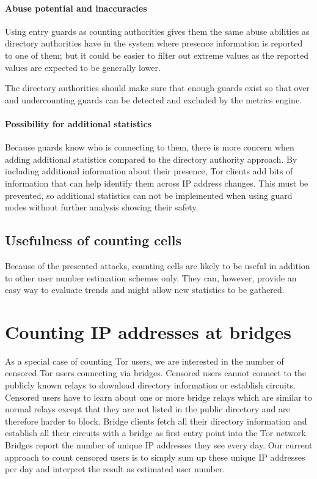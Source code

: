 \documentclass{article}
\begin{document}
\paragraph{Abuse potential and inaccuracies}
Using entry guards as counting authorities gives them the same
abuse abilities as directory authorities have in the system where
presence information is reported to one of them; but it could be easier
to filter out extreme values as the reported values are expected to
be generally lower.

The directory authorities should make sure that enough guards exist
so that over and undercounting guards can be detected and excluded
by the metrics engine.

\paragraph{Possibility for additional statistics}
Because guards know who is connecting to them, there is more concern
when adding additional statistics compared to the directory authority
approach.
By including additional information about their presence, Tor clients add
bits of information that can help identify them across IP address changes.
This must be prevented, so additional statistics can not be implemented
when using guard nodes without further analysis showing their safety.

\subsection{Usefulness of counting cells}
Because of the presented attacks, counting cells are likely to be useful
in addition to other user number estimation schemes only.
They can, however, provide an easy way to evaluate trends and
might allow new statistics to be gathered.

\section{Counting IP addresses at bridges}
\label{sec:bridges}

As a special case of counting Tor users, we are interested in the number
of censored Tor users connecting via bridges.
Censored users cannot connect to the publicly known relays to download
directory information or establish circuits.
Censored users have to learn about one or more bridge relays which are
similar to normal relays except that they are not listed in the public
directory and are therefore harder to block.
Bridge clients fetch all their directory information and establish all
their circuits with a bridge as first entry point into the Tor network.
Bridges report the number of unique IP addresses they see every day.
Our current approach to count censored users is to simply sum up these
unique IP addresses per day and interpret the result as estimated user
number.
\end{document}
